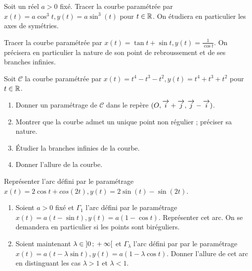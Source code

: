 \begin{exercice}[Astroïde]
  Soit un réel \(a > 0\) fixé. Tracer la courbe paramétrée par \(x(t) = a 
  \cos^3 t, y(t) = a \sin^3(t)\) pour \(t \in \mathbb{R}\). On étudiera en particulier 
  les axes de symétries.
\end{exercice}

\begin{exercice}
  Tracer la courbe paramétrée par \(x(t) = \tan t + \sin t, y(t) = 
  \frac{1}{\cos t}\). On précisera en particulier la nature de son point de 
  rebroussement et de ses branches infinies.
\end{exercice}

\begin{exercice}
  Soit \(\mathcal{C}\) la courbe paramétrée par \(x(t) = t^4 - t^3 - t^2, y(t) 
  = t^4 + t^3 + t^2\) pour \(t \in \mathbb{R}\).
  \begin{enumerate}
    \item Donner un paramétrage de \(\mathcal{C}\) dans le repère \((O, \overrightarrow{i} + 
      \overrightarrow{j}, \overrightarrow{j}-\overrightarrow{i})\).
    \item Montrer que la courbe admet un unique point non régulier ; préciser 
      sa nature.
    \item Étudier la branches infinies de la courbe.
    \item Donner l'allure de la courbe.
  \end{enumerate}
\end{exercice}

\begin{exercice}[Deltoïde]
  Représenter l'arc défini par le paramétrage \(x(t) = 2 \cos t + cos(2t), 
  y(t) = 2\sin(t) - \sin(2t)\).
\end{exercice}

\begin{exercice}[Cycloïde]
  \begin{enumerate}
    \item Soient \(a>0\) fixé et \(\Gamma_1\) l'arc défini par le paramétrage 
      \(x(t) = a(t-\sin t), y(t) = a(1-\cos t)\). Représenter cet arc. On se 
      demandera en particulier si les points sont biréguliers.
    \item Soient maintenant \(\lambda \in \left] 0 \, ; {} +\infty \right[\) et 
      \(\Gamma_\lambda\) l'arc défini par par le paramétrage \(x(t) = 
      a(t-\lambda \sin t), y(t) = a(1-\lambda \cos t)\). Donner l'allure de 
      cet arc en distinguant les cas \(\lambda >1\) et \(\lambda < 1\).
  \end{enumerate}
\end{exercice}

